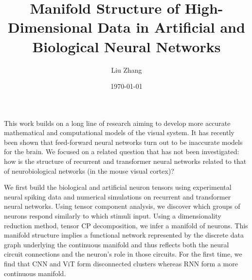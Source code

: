 \documentclass{article}
\title{Manifold Structure of High-Dimensional Data in Artificial and Biological Neural Networks}
\author{Liu Zhang}
\date{\today}
\begin{document}
\maketitle
This work builds on a long line of research aiming to develop more accurate mathematical and computational models of the visual system. It has recently been shown that feed-forward neural networks turn out to be inaccurate models for the brain. We focused on a related question that has not been investigated: how is the structure of recurrent and transformer neural networks related to that of neurobiological networks (in the mouse visual cortex)?

We first build the biological and artificial neuron tensors using experimental neural spiking data and numerical simulations on recurrent and transformer neural networks. Using tensor component analysis, we discover which groups of neurons respond similarly to which stimuli input. Using a dimensionality reduction method, tensor CP decomposition, we infer a manifold of neurons. This manifold structure implies a functional network represented by the discrete data graph underlying the continuous manifold and thus reflects both the neural circuit connections and the neuron’s role in those circuits. For the first time, we find that CNN and ViT form disconnected clusters whereas RNN form a more continuous manifold.
\end{document}
